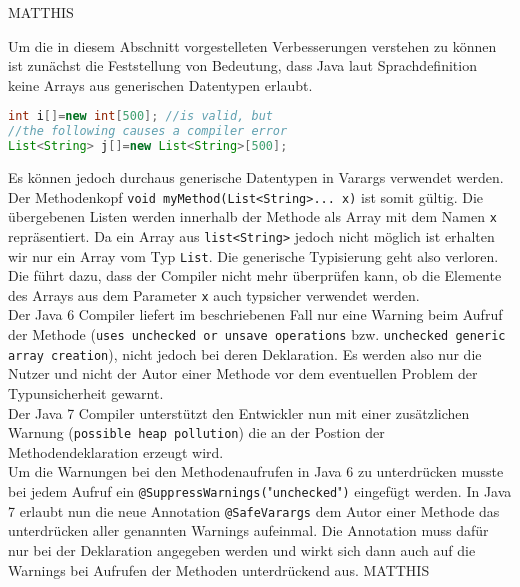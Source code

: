 \documentclass[times, 10pt,twocolumn]{article}
\begin{document}
MATTHIS

Um die in diesem Abschnitt vorgestelleten Verbesserungen verstehen zu können ist zunächst die Feststellung von Bedeutung, dass Java laut Sprachdefinition keine Arrays aus generischen Datentypen erlaubt.
\begin{lstlisting}[language=java,breaklines=true]
int i[]=new int[500]; //is valid, but
//the following causes a compiler error
List<String> j[]=new List<String>[500];
\end{lstlisting}
Es können jedoch durchaus generische Datentypen in Varargs verwendet werden. Der Methodenkopf \texttt{void myMethod(List<String>... x)} ist somit gültig. Die übergebenen Listen werden innerhalb der Methode als Array mit dem Namen \texttt{x} repräsentiert. Da ein Array aus \texttt{list<String>} jedoch nicht möglich ist erhalten wir nur ein Array vom Typ \texttt{List}. Die generische Typisierung geht also verloren.\\

Die führt dazu, dass der Compiler nicht mehr überprüfen kann, ob die Elemente des Arrays aus dem Parameter \texttt{x} auch typsicher verwendet werden.\cite{v2bJava7}\\

Der Java 6 Compiler liefert im beschriebenen Fall nur eine Warning beim Aufruf der Methode (\texttt{uses unchecked or unsave operations} bzw. \texttt{unchecked generic array creation}), nicht jedoch bei deren Deklaration. Es werden also nur die Nutzer und nicht der Autor einer Methode vor dem eventuellen Problem der Typunsicherheit gewarnt.\\

Der Java 7 Compiler unterstützt den Entwickler nun mit einer zusätzlichen Warnung (\texttt{possible heap pollution}) die an der Postion der Methodendeklaration erzeugt wird.\\

Um die Warnungen bei den Methodenaufrufen in Java 6 zu unterdrücken musste bei jedem Aufruf ein 
\texttt{@SuppressWarnings(}"\texttt{unchecked}"\texttt{)} eingefügt werden. In Java 7 erlaubt nun die neue Annotation \texttt{@SafeVarargs} dem Autor einer Methode das unterdrücken aller genannten Warnings aufeinmal. Die Annotation muss dafür nur bei der Deklaration angegeben werden und wirkt sich dann auch auf die Warnings bei Aufrufen der Methoden unterdrückend aus.
MATTHIS
\end{document}
